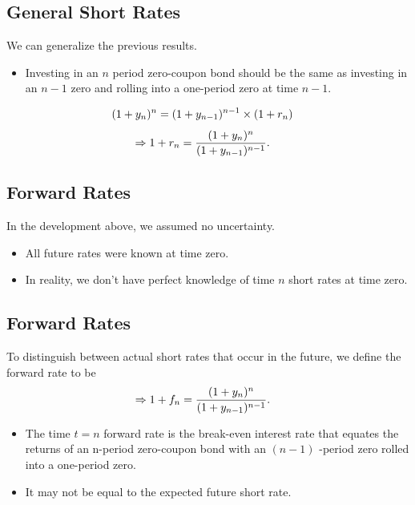 \documentclass[letterpaper,10pt,english]{sphinxmanual}
\begin{document}
\subsection{General Short Rates}
\label{termStructure:general-short-rates}
We can generalize the previous results.
\begin{itemize}
\item {} 
Investing in an $n$ period zero-coupon bond should be the same
as investing in an $n-1$ zero and rolling into a one-period
zero at time $n-1$.

\end{itemize}
\begin{gather}
\begin{split}(1+y_n)^n & = (1+y_{n-1})^{n-1} \times (1+r_n)\end{split}\notag
\end{gather}\begin{gather}
\begin{split}\Rightarrow 1+r_n & = \frac{(1+y_n)^n}{(1+y_{n-1})^{n-1}}.\end{split}\notag
\end{gather}

\subsection{Forward Rates}
\label{termStructure:forward-rates}
In the development above, we assumed no uncertainty.
\begin{itemize}
\item {} 
All future rates were known at time zero.

\end{itemize}
\begin{itemize}
\item {} 
In reality, we don't have perfect knowledge of time $n$ short
rates at time zero.

\end{itemize}


\subsection{Forward Rates}
\label{termStructure:id7}
To distinguish between actual short rates that occur in the future, we
define the forward rate to be
\begin{gather}
\begin{split}\Rightarrow 1+f_n & = \frac{(1+y_n)^n}{(1+y_{n-1})^{n-1}}.\end{split}\notag
\end{gather}\begin{itemize}
\item {} 
The time $t=n$ forward rate is the break-even interest rate
that equates the returns of an n-period zero-coupon bond with an
$(n-1)$ -period zero rolled into a one-period zero.

\end{itemize}
\begin{itemize}
\item {} 
It may not be equal to the expected future short rate.

\end{itemize}
\end{document}
